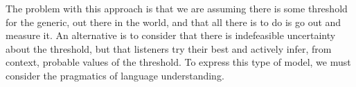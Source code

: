 \documentclass[10pt,letterpaper]{article}
\begin{document}
The problem with this approach is that we are assuming there is some threshold for the generic, out there in the world, and that all there is to do is go out and measure it. An alternative is to consider that there is indefeasible uncertainty about the threshold, but that listeners try their best and actively infer, from context, probable values of the threshold. To express this type of model, we must consider the pragmatics of language understanding. 


%
%
%
%		
%		
%			
%
\end{document}
